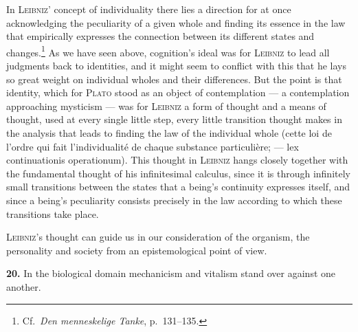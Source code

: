 \documentclass[12pt]{book}
\newcommand{\hnum}[1]{\textbf{#1.}\enspace}
\newcommand{\opage}[1]{\marginnote{\footnotesize\textit{[#1]}}}
\begin{document}
In \textsc{Leibniz}' concept of individuality there lies a direction for at once
\opage{52}acknowledging the peculiarity of a given whole and finding its essence in the law
that empirically expresses the connection between its different states and
changes.\footnote{Cf.\ \textit{Den menneskelige Tanke}, p.\ 131--135.} As we have
seen above, cognition's ideal was for \textsc{Leibniz} to lead all judgments back to
identities, and it might seem to conflict with this that he lays so great weight on
individual wholes and their differences. But the point is that identity, which for
\textsc{Plato} stood as an object of contemplation --- a contemplation approaching
mysticism --- was for \textsc{Leibniz} a form of thought and a means of thought, used
at every single little step, every little transition thought makes in the analysis
that leads to finding the law of the individual whole (cette loi de l'ordre qui fait
l'individualité de chaque substance particulière; --- lex continuationis operationum).
This thought in \textsc{Leibniz} hangs closely together with the fundamental thought
of his infinitesimal calculus, since it is through infinitely small transitions
between the states that a being's continuity expresses itself, and since a being's
peculiarity consists precisely in the law according to which these transitions take
place.

\textsc{Leibniz}'s thought can guide us in our consideration of the organism, the
personality and society from an epistemological point of view.

\hnum{20} In the biological domain mechanicism and vitalism stand over against one
another.
\end{document}
